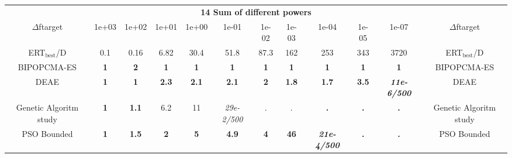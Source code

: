 \begin{tabular}{cccccccccccc}
 & \multicolumn{10}{c}{{\normalsize \textbf{14 Sum of different powers}}}\\
$\Delta$ftarget& 1e+03& 1e+02& 1e+01& 1e+00& 1e-01& 1e-02& 1e-03& 1e-04& 1e-05& 1e-07 & $\Delta$ftarget \\
ERT$_{\textrm{best}}$/D& 0.1& 0.16& 6.82& 30.4& 51.8& 87.3& 162& 253& 343& 3720 & ERT$_{\textrm{best}}$/D \\
\hline
BIPOPCMA-ES & \textbf{1} & \textbf{2} & \textbf{1} & \textbf{1} & \textbf{1} & \textbf{1} & \textbf{1} & \textbf{1} & \textbf{1} & \textbf{1} & BIPOPCMA-ES \cite{add_an_entry_for_BIPOPCMA-ES_in_bbob.bib}\\
DEAE & \textbf{1} & \textbf{1} & \textbf{2.3} & \textbf{2.1} & \textbf{2.1} & \textbf{2} & \textbf{1.8} & \textbf{1.7} & \textbf{3.5} & \textbf{\textit{11e-6}\textit{/500}} & DEAE \cite{add_an_entry_for_DEAE_in_bbob.bib}\\
Genetic Algoritm study & \textbf{1} & \textbf{1.1} & 6.2 & 11 & \textit{29e-2}\textit{/500} & . & . & \textbf{.} & \textbf{.} & \textbf{.} & Genetic Algoritm study \cite{add_an_entry_for_Genetic Algoritm study_in_bbob.bib}\\
PSO Bounded & \textbf{1} & \textbf{1.5} & \textbf{2} & \textbf{5} & \textbf{4.9} & \textbf{4} & \textbf{46} & \textbf{\textit{21e-4}\textit{/500}} & \textbf{.} & \textbf{.} & PSO Bounded \cite{add_an_entry_for_PSO Bounded_in_bbob.bib}
\end{tabular}
